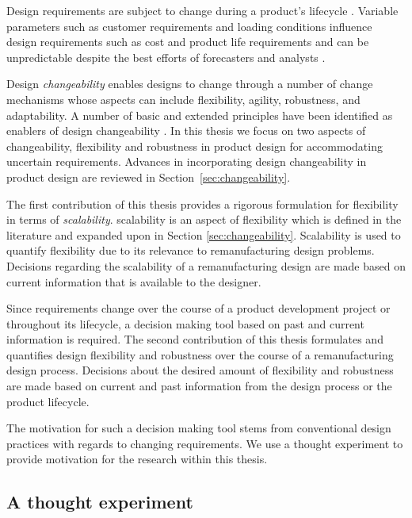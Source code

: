 Design requirements are subject to change during a product's lifecycle \cite{Goodall2014,Lindahl2007,Thierry2012,American2017}. Variable parameters such as customer requirements and loading conditions influence design requirements such as cost and product life requirements \cite{Fricke2005} and can be unpredictable despite the best efforts of forecasters and analysts \cite{DeNeufville2011}.

Design \textit{changeability} enables designs to change through a number of change mechanisms whose aspects can include flexibility, agility, robustness, and adaptability. A number of basic and extended principles have been identified as enablers of design changeability \cite{Fricke2005}. In this thesis we focus on two aspects of changeability, flexibility and robustness in product design for accommodating uncertain requirements. Advances in incorporating design changeability in product design are reviewed in Section~\ref{sec:changeability}.

The first contribution of this thesis provides a rigorous formulation for flexibility in terms of \textit{scalability}. scalability is an aspect of flexibility which is defined in the literature and expanded upon in Section \ref{sec:changeability}. Scalability is used to quantify flexibility due to its relevance to remanufacturing design problems. Decisions regarding the scalability of a remanufacturing design are made based on current information that is available to the designer. 

Since requirements change over the course of a product development project or throughout its lifecycle, a decision making tool based on past and current information is required. The second contribution of this thesis formulates and quantifies design flexibility and robustness over the course of a remanufacturing design process. Decisions about the desired amount of flexibility and robustness are made based on current and past information from the design process or the product lifecycle.

The motivation for such a decision making tool stems from conventional design practices with regards to changing requirements. We use a thought experiment to provide motivation for the research within this thesis.

\subsection{A thought experiment} \label{subsec:thoughtexperiment}

